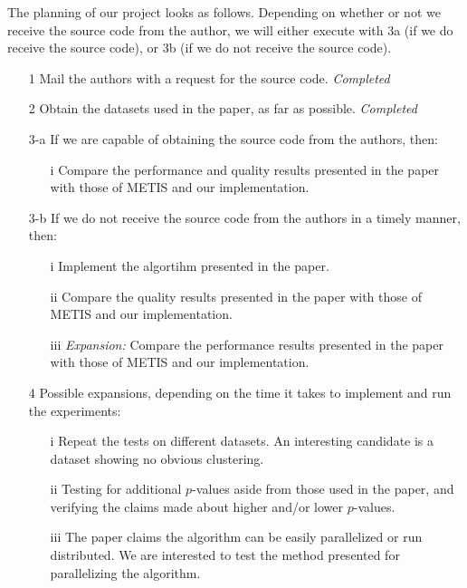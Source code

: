 \documentclass[a4paper,11pt]{article}
\begin{document}
The planning of our project looks as follows. Depending on whether or not we receive the source code from the author, we will either execute with 3a (if we do receive the source code), or 3b (if we do not receive the source code).
\begin{enumerate}
\item[1] Mail the authors with a request for the source code. \textit{Completed}\item[2] Obtain the datasets used in the paper, as far as possible. \textit{Completed}
\item[3-a] If we are capable of obtaining the source code from the authors, then:
\begin{enumerate}
\item[i] Compare the performance and quality results presented in the paper with those of METIS and our implementation.
\end{enumerate}
\item[3-b] If we do not receive the source code from the authors in a timely manner, then:
\begin{enumerate}
\item[i] Implement the algortihm presented in the paper.
\item[ii] Compare the quality results presented in the paper with those of METIS and our implementation.
\item[iii] \textit{Expansion:} Compare the performance results presented in the paper with those of METIS and our implementation.
\end{enumerate}
\item[4] Possible expansions, depending on the time it takes to implement and run the experiments:
\begin{enumerate}
\item[i] Repeat the tests on different datasets. An interesting candidate is a dataset showing no obvious clustering. %
\item[ii] Testing for additional $p$-values aside from those used in the paper, and verifying the claims made about higher and/or lower $p$-values.
\item[iii] The paper claims the algorithm can be easily parallelized or run distributed. We are interested to test the method presented for parallelizing the algorithm.
\end{enumerate}
\end{enumerate}
\end{document}
